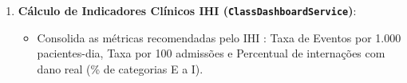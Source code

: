\begin{enumerate}
    \item \textbf{Cálculo de Indicadores Clínicos IHI (\texttt{ClassDashboardService})}:
    \begin{itemize}
        \item Consolida as métricas recomendadas pelo IHI \cite{ihi2009}: Taxa de Eventos por 1.000 pacientes-dia, Taxa por 100 admissões e Percentual de internações com dano real (\% de categorias E a I).
    \end{itemize}
\end{enumerate}

